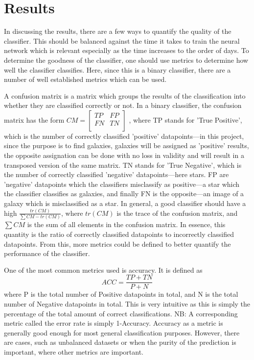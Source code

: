 \documentclass[a4paper,fleqn,usenatbib]{mnras}
\begin{document}
\section{Results}
In discussing the results, there are a few ways to quantify the quality of the classifier. This should be balanced against the time it takes to train the neural network which is relevant especially as the time increases to the order of days. To determine the goodness of the classifier, one should use metrics to determine how well the classifier classifies. Here, since this is a binary classifier, there are a  number of well established metrics which can be used. 

A confusion matrix is a matrix which groups the results of the classification into whether they are classified correctly or not. In a binary classifier, the confusion matrix has the form $CM=\begin{bmatrix}
           TP & FP \\
           FN & TN \\
         \end{bmatrix}$ , where TP stands for 'True Positive', which is the number of correctly classified 'positive' datapoints---in this project, since the purpose is to find galaxies, galaxies will be assigned as 'positive' results, the opposite assignation can be done with no loss in validity and will result in a transposed version of the same matrix. TN stands for 'True Negative', which is the number of correctly classified 'negative' datapoints---here stars. FP are 'negative' datapoints which the classifiers misclassify as positive---a star which the classifier classifies as galaxies, and finally FN is the opposite---an image of a galaxy which is misclassified as a star. In general, a good classifier should have a high $\frac{tr(CM)}{\sum{CM}-tr(CM)}$, where $tr(CM)$ is the trace of the confusion matrix, and $\sum{CM}$ is the sum of all elements in the confusion matrix. In essence, this quantity is the ratio of correctly classified datapoints to incorrectly classified datapoints. From this, more metrics could be defined to better quantify the performance of the classifier. 
         
 One of the most common metrics used is accuracy. It is defined as 
 \begin{equation}
 	ACC=\frac{TP+TN}{P+N}
 \end{equation}
  where P is the total number of Positive datapoints in total, and N is the total number of Negative datapoints in total. This is very intuitive as this is simply the percentage of the total amount of correct classifications. NB: A corresponding metric called the error rate is simply 1-Accuracy. Accuracy as a metric is generally good enough for most general classification purposes. However, there are cases, such as unbalanced datasets or when the purity of the prediction is important, where other metrics are important. 
  
\end{document}
